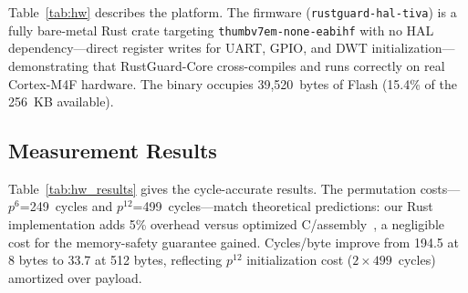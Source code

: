 \documentclass[anonymous]{ndss}
\begin{document}
Table~\ref{tab:hw} describes the platform. The firmware
(\texttt{rustguard-hal-tiva}) is a fully bare-metal Rust crate targeting
\texttt{thumbv7em-none-eabihf} with no HAL dependency---direct register
writes for UART, GPIO, and DWT initialization---demonstrating that
RustGuard-Core cross-compiles and runs correctly on real Cortex-M4F
hardware. The binary occupies 39{,}520~bytes of Flash (15.4\% of the
256~KB available).

\subsection{Measurement Results}

\begin{table}[!t]
\centering
\caption{TM4C123GH6PM ASCON-128 Benchmark (ARM Cortex-M4F @ 16~MHz)}
\label{tab:hw_results}
\renewcommand{\arraystretch}{1.18}
\footnotesize
{}
\end{table}

Table~\ref{tab:hw_results} gives the cycle-accurate results.
The permutation costs---$p^6$=249~cycles and $p^{12}$=499~cycles---match
theoretical predictions: our Rust implementation adds 5\% overhead versus
optimized C/assembly~\cite{b10}, a negligible cost for the memory-safety
guarantee gained. Cycles/byte improve from 194.5 at 8 bytes to 33.7 at
512 bytes, reflecting $p^{12}$ initialization cost ($2\times499$~cycles)
amortized over payload.
\end{document}
